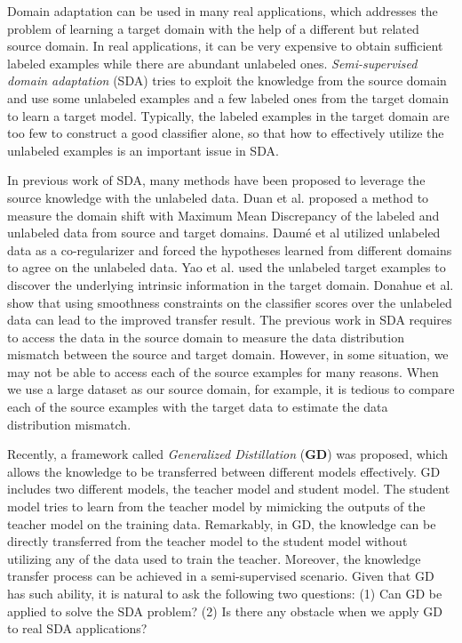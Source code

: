 Domain adaptation can be used in many real applications, which addresses the problem of learning a target domain with the help of a different but related source domain. 
In real applications, it can be very expensive to obtain sufficient labeled examples while there are abundant unlabeled ones. 
\textit{Semi-supervised domain adaptation} (SDA) tries to exploit the knowledge from the source domain and use some unlabeled examples and a few labeled ones from the target domain to learn a target model. Typically, the labeled examples in the target domain are too few to construct a good classifier alone, so that how to effectively utilize the unlabeled examples is an important issue in SDA. 

In previous work of SDA, many methods have been proposed to leverage the source knowledge with the unlabeled data.
Duan et al.\cite{duan2012visual} proposed a method to measure the domain shift with Maximum Mean Discrepancy of the labeled and unlabeled data from source and target domains. Daum{\'e} et al\cite{daume2010frustratingly} utilized unlabeled data as a co-regularizer and forced the hypotheses learned from different domains to agree on the unlabeled data. Yao et al.\cite{yao2015semi} used the unlabeled target examples to discover the underlying intrinsic information in the target domain. Donahue et al.\cite{Donahue_2013_CVPR} show that using smoothness constraints on the classifier scores over the unlabeled data can lead to the improved transfer result.
The previous work in SDA requires to access the data in the source domain to measure the data distribution mismatch between the source and target domain.
However, in some situation, we may not be able to access each of the source examples for many reasons. When we use a large dataset as our source domain, for example, it is tedious to compare each of the source examples with the target data to estimate the data distribution mismatch.

Recently, a framework called \textit{Generalized Distillation} (\textbf{GD})\cite{lopez2015unifying} was proposed, which allows the knowledge to be transferred between different models effectively. GD includes two different models, the teacher model and student model. The student model tries to learn from the teacher model by mimicking the outputs of the teacher model on the training data. Remarkably, in GD, the knowledge can be directly transferred from the teacher model to the student model without utilizing any of the data used to train the teacher. Moreover, the knowledge transfer process can be achieved in a semi-supervised scenario\cite{lopez2015unifying}.
Given that GD has such ability, it is natural to ask the following two questions: (1) Can GD be applied to solve the SDA problem? (2) Is there any obstacle when we apply GD to real SDA applications?

